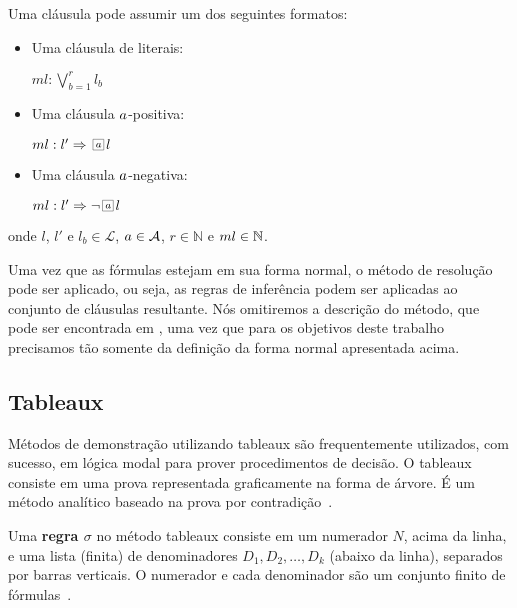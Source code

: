 Uma cláusula pode assumir um dos seguintes formatos:

\begin{itemize} \item Uma cláusula de literais:

        \begin{center} $ml: \bigvee^r_{b=1} l_b$ \end{center} \item Uma cláusula
                $a$-positiva:

        \begin{center} $ml: l' \Rightarrow \nec{\agent} l$ \end{center} \item
                Uma cláusula $a$-negativa:

        \begin{center} $ml: l' \Rightarrow \neg \nec{\agent} l$ \end{center}
    \end{itemize} onde $l$, $l'$ e $l_b \in \mathcal{L}$, $a \in {\cal{A}}$,
    $r \in \mathbb{N}$ e $ml \in \mbox{$\mathbb N$}$.

Uma vez que as fórmulas estejam em sua forma normal, o método de resolução pode
ser aplicado, ou seja, as regras de inferência podem ser aplicadas ao conjunto
de cláusulas resultante. Nós omitiremos a descrição do método, que pode ser
encontrada em \cite{DBLP:conf/tableaux/NalonHD15}, uma vez que para os objetivos
deste trabalho precisamos tão somente da definição da forma normal apresentada
acima.

\subsection{Tableaux}
\label{sub:tableaux}
Métodos de demonstração utilizando tableaux são frequentemente utilizados, com
sucesso, em lógica modal para prover procedimentos de decisão. O tableaux
consiste em uma prova representada graficamente na forma de árvore. É um método
analítico baseado na prova por contradição~\cite{fit:tableaux}.

\begin{definition}
    Uma \textbf{regra $\sigma$} no método tableaux consiste em um numerador $N$,
    acima da linha, e uma lista (finita) de denominadores $D_1, D_2,
    \ldots, D_k$ (abaixo da linha), separados por barras verticais. O numerador e
    cada denominador são um conjunto finito de fórmulas~\cite{tableaux:def}.
\end{definition}
 
